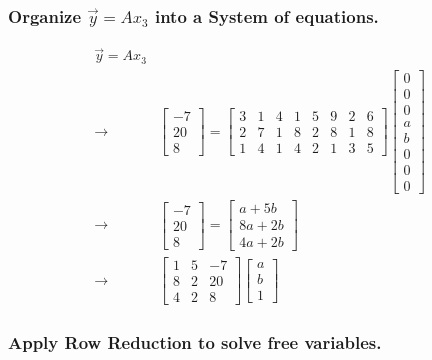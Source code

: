 \documentclass[11pt]{article}
\begin{document}
\subsubsection{Organize \(\vec y = A x_3\) into a System of equations.}
\label{sec:org8cd83c7}
\begin{equation}
\begin{split}
\vec y = A x_3 & \\
\to & \begin{bmatrix} -7\\ 20\\ 8 \end{bmatrix} = \begin{bmatrix} 3 & 1 & 4 & 1 & 5 & 9 & 2 & 6\\ 2 & 7 & 1 & 8 & 2 & 8 &
1 & 8\\ 1 & 4 & 1 & 4 & 2 & 1 & 3 & 5 \end{bmatrix} \begin{bmatrix}
0\\ 0\\ 0\\ a\\ b\\ 0\\ 0\\ 0
\end{bmatrix}\\
\to & \begin{bmatrix}
-7\\ 20\\ 8
\end{bmatrix} = \begin{bmatrix}
a + 5b\\
8a + 2b\\
4a + 2b
\end{bmatrix}\\
\to & \begin{bmatrix}
1 & 5 & -7\\
8 & 2 & 20\\
4 & 2 & 8
\end{bmatrix} \begin{bmatrix}
a\\ b\\ 1
\end{bmatrix}
\end{split}
\end{equation}

\subsubsection{Apply Row Reduction to solve free variables.}
\label{sec:orgbac5438}
\end{document}
